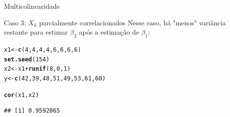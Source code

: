\documentclass{beamer}\usepackage[]{graphicx}\usepackage[]{color}
\makeatletter
\newcommand{\hlnum}[1]{\textcolor[rgb]{0.686,0.059,0.569}{#1}}%
\newcommand{\hlopt}[1]{\textcolor[rgb]{0,0,0}{#1}}%
\newcommand{\hlstd}[1]{\textcolor[rgb]{0.345,0.345,0.345}{#1}}%
\newcommand{\hlkwb}[1]{\textcolor[rgb]{0.69,0.353,0.396}{#1}}%
\newcommand{\hlkwd}[1]{\textcolor[rgb]{0.737,0.353,0.396}{\textbf{#1}}}%
\newenvironment{kframe}{%
 \def\at@end@of@kframe{}%
 \ifinner\ifhmode%
  \def\at@end@of@kframe{\end{minipage}}%
  \begin{minipage}{\columnwidth}%
 \fi\fi%
 \def\FrameCommand##1{\hskip\@totalleftmargin \hskip-\fboxsep
 \colorbox{shadecolor}{##1}\hskip-\fboxsep
     \hskip-\linewidth \hskip-\@totalleftmargin \hskip\columnwidth}%
 \MakeFramed {\advance\hsize-\width
   \@totalleftmargin\z@ \linewidth\hsize
   \@setminipage}}%
 {\par\unskip\endMakeFramed%
 \at@end@of@kframe}
\newenvironment{knitrout}{}{} %
\renewenvironment{knitrout}{\setlength{\topsep}{0mm}}{}
\makeatother
\begin{document}
\begin{frame}[fragile]{Multicolinearidade}

Caso 3: $X_k$ parcialmente correlacionados
\vfill
Nesse caso, há "menos" variância restante para estimar $\beta _2$ após a estimação de $\beta _1$:
\vfill
\begin{knitrout}\tiny
{}\color{fgcolor}\begin{kframe}
\begin{alltt}
\hlstd{x1} \hlkwb{<-} \hlkwd{c}\hlstd{(}\hlnum{4}\hlstd{,}\hlnum{4}\hlstd{,}\hlnum{4}\hlstd{,}\hlnum{4}\hlstd{,}\hlnum{6}\hlstd{,}\hlnum{6}\hlstd{,}\hlnum{6}\hlstd{,}\hlnum{6}\hlstd{)}
\hlkwd{set.seed}\hlstd{(}\hlnum{154}\hlstd{)}
\hlstd{x2} \hlkwb{<-} \hlstd{x1} \hlopt{+} \hlkwd{runif}\hlstd{(}\hlnum{8}\hlstd{,}\hlnum{0}\hlstd{,}\hlnum{1}\hlstd{)}
\hlstd{y} \hlkwb{<-} \hlkwd{c}\hlstd{(}\hlnum{42}\hlstd{,}\hlnum{39}\hlstd{,}\hlnum{48}\hlstd{,}\hlnum{51}\hlstd{,}\hlnum{49}\hlstd{,}\hlnum{53}\hlstd{,}\hlnum{61}\hlstd{,}\hlnum{60}\hlstd{)}

\hlkwd{cor}\hlstd{(x1,x2)}
\end{alltt}
\begin{verbatim}
## [1] 0.9592065
\end{verbatim}
\end{kframe}
\end{knitrout}

\end{frame}
\end{document}
